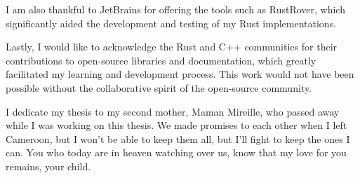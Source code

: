 I am also thankful to JetBrains for offering the tools such as RustRover, which significantly aided the development and testing of my Rust implementations.

Lastly, I would like to acknowledge the Rust and C++ communities for their contributions to open-source libraries and documentation, which greatly facilitated my learning and development process.
This work would not have been possible without the collaborative spirit of the open-source community.

I dedicate my thesis to my second mother, Maman Mireille, who passed away while I was working on this thesis.
We made promises to each other when I left Cameroon, but I won't be able to keep them all, but I'll fight to keep the ones I can.
You who today are in heaven watching over us, know that my love for you remains, your child.


